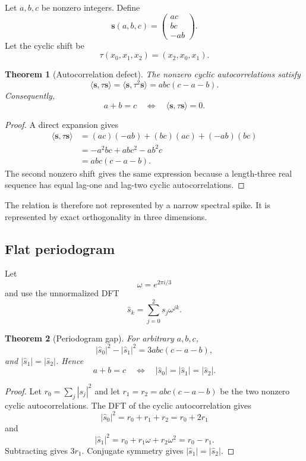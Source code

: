 \documentclass[11pt]{article}
\newtheorem{theorem}{Theorem}[section]
\begin{document}
Let $a,b,c$ be nonzero integers.  Define
\[
  \boxed{\mathbf s(a,b,c)=\begin{pmatrix}ac\\bc\\-ab\end{pmatrix}.}
\]
Let the cyclic shift be
\[
  \tau(x_0,x_1,x_2)=(x_2,x_0,x_1).
\]

\begin{theorem}[Autocorrelation defect]
The nonzero cyclic autocorrelations satisfy
\[
  \langle\mathbf s,\tau\mathbf s\rangle
  =\langle\mathbf s,\tau^2\mathbf s\rangle
  =abc(c-a-b).
\]
Consequently,
\[
  a+b=c
  \quad\Longleftrightarrow\quad
  \langle\mathbf s,\tau\mathbf s\rangle=0.
\]
\end{theorem}

\begin{proof}
A direct expansion gives
\begin{align*}
\langle\mathbf s,\tau\mathbf s\rangle
&=(ac)(-ab)+(bc)(ac)+(-ab)(bc)\\
&=-a^2bc+abc^2-ab^2c\\
&=abc(c-a-b).
\end{align*}
The second nonzero shift gives the same expression because a length-three real sequence has equal lag-one and lag-two cyclic autocorrelations.
\end{proof}

The relation is therefore not represented by a narrow spectral spike.  It is represented by exact orthogonality in three dimensions.

\subsection{Flat periodogram}

Let
\[
  \omega=e^{2\pi i/3}
\]
and use the unnormalized DFT
\[
  \widehat s_k=\sum_{j=0}^2s_j\omega^{jk}.
\]

\begin{theorem}[Periodogram gap]
For arbitrary $a,b,c$,
\[
  |\widehat s_0|^2-|\widehat s_1|^2
  =3abc(c-a-b),
\]
and $|\widehat s_1|=|\widehat s_2|$.  Hence
\[
  \boxed{a+b=c
  \quad\Longleftrightarrow\quad
  |\widehat s_0|=|\widehat s_1|=|\widehat s_2|.}
\]
\end{theorem}

\begin{proof}
Let $r_0=\sum_j|s_j|^2$ and let $r_1=r_2=abc(c-a-b)$ be the two nonzero cyclic autocorrelations.  The DFT of the cyclic autocorrelation gives
\[
  |\widehat s_0|^2=r_0+r_1+r_2=r_0+2r_1
\]
and
\[
  |\widehat s_1|^2=r_0+r_1\omega+r_2\omega^2=r_0-r_1.
\]
Subtracting gives $3r_1$.  Conjugate symmetry gives $|\widehat s_1|=|\widehat s_2|$.
\end{proof}
\end{document}
